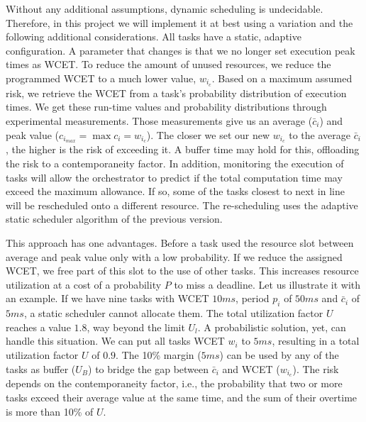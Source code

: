 \documentclass[]{scrartcl}
\begin{document}
Without any additional assumptions, dynamic scheduling is undecidable. %
Therefore, in this project we will implement it at best using a variation and the following additional considerations.
All tasks have a static, adaptive configuration.
A parameter that changes is that we no longer set execution peak times as WCET. 
To reduce the amount of unused resources, we reduce the programmed WCET to a much lower value, $w_{i_c}$.
Based on a maximum assumed risk, we retrieve the WCET from a task's probability distribution of execution times.
We get these run-time values and probability distributions through experimental measurements. 
Those measurements give us an average ($\bar c_i$) and peak value ($c_{i_{max}} = \max c_i = w_{i_c} $). 
The closer we set our new $w_{i_c}$ to the average $\bar c_i$, the higher is the risk of exceeding it.
A buffer time may hold for this, offloading the risk to a contemporaneity factor.
In addition, monitoring the execution of tasks will allow the orchestrator to predict if the total computation time may exceed the maximum allowance.
If so, some of the tasks closest to next in line will be rescheduled onto a different resource.
The re-scheduling uses the adaptive static scheduler algorithm of the previous version.

This approach has one advantages. 
Before a task used the resource slot between average and peak value only with a low probability.
If we reduce the assigned WCET, we free part of this slot to the use of other tasks.
This increases resource utilization at a cost of a probability $P$ to miss a deadline.
Let us illustrate it with an example.
If we have nine tasks with WCET $10ms$, period $p_i$ of $50ms$ and $\bar c_i$ of $5ms$, a static scheduler cannot allocate them. 
The total utilization factor $U$ reaches a value $1.8$, way beyond the limit $U_l$.
A probabilistic solution, yet, can handle this situation. 
We can put all tasks WCET $w_i$ to $5ms$, resulting in a total utilization factor $U$ of $0.9$.
The 10\% margin ($5ms$) can be used by any of the tasks as buffer ($U_B$) to bridge the gap between $\bar c_i$ and WCET ($w_{i_c}$).
The risk depends on the contemporaneity factor, i.e., the probability that two or more tasks exceed their average value at the same time, and the sum of their overtime is more than 10\% of $U$.
\end{document}
